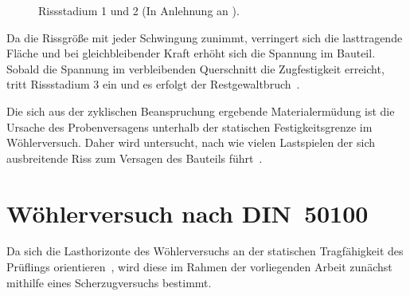 \begin{figure}[H]
\caption{Rissstadium 1 und 2 (In Anlehnung an \cite[Seite 268]{Werkstofftechnik-Praktikum2021}).}
\label{fig:Rissausbreitung}
\end{figure}

Da die Rissgröße mit jeder Schwingung zunimmt, verringert sich die lasttragende Fläche und bei gleichbleibender Kraft erhöht sich die Spannung im Bauteil. Sobald die Spannung im verbleibenden Querschnitt die Zugfestigkeit erreicht, tritt Rissstadium 3 ein und es erfolgt der Restgewaltbruch~\cite[Seite~268]{Werkstofftechnik-Praktikum2021}. 

Die sich aus der zyklischen Beanspruchung ergebende Materialermüdung ist die Ursache des Probenversagens unterhalb der statischen Festigkeitsgrenze im Wöhlerversuch. Daher wird untersucht, nach wie vielen Lastspielen der sich ausbreitende Riss zum Versagen des Bauteils führt~\cite[Seite~261]{Werkstofftechnik-Praktikum2021}.
 
\clearpage

	\section{Wöhlerversuch nach DIN~50100} 
Da sich die Lasthorizonte des Wöhlerversuchs an der statischen Tragfähigkeit des Prüflings orientieren~\cite[Seite~272]{Werkstofftechnik-Praktikum2021}, wird diese im Rahmen der vorliegenden Arbeit zunächst mithilfe eines Scherzugversuchs bestimmt.
	
